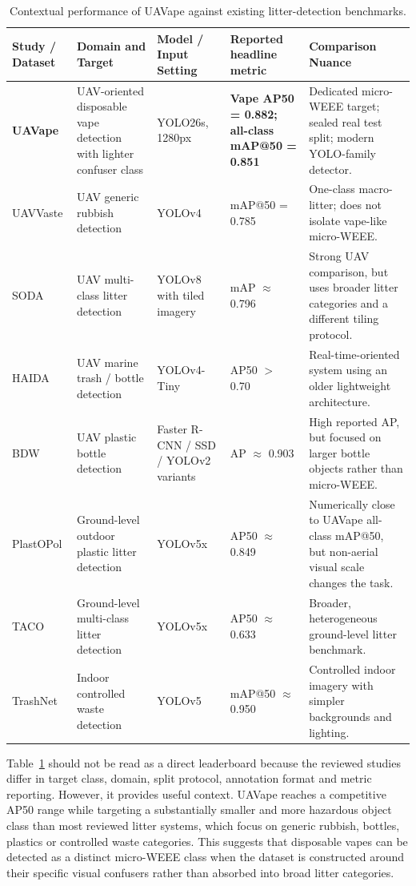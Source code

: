 \begin{table}[H]
\centering
\scriptsize
\renewcommand{\arraystretch}{1.2}
\begin{tabularx}{\textwidth}{@{} p{} p{} p{} p{} X @{}}
\toprule
\textbf{Study / Dataset} & \textbf{Domain and Target} & \textbf{Model / Input Setting} & \textbf{Reported headline metric} & \textbf{Comparison Nuance} \\
\midrule
\textbf{UAVape} & UAV-oriented disposable vape detection with lighter confuser class & YOLO26s, 1280px & \textbf{Vape AP50 = 0.882; all-class mAP@50 = 0.851} & Dedicated micro-WEEE target; sealed real test split; modern YOLO-family detector. \\
UAVVaste & UAV generic rubbish detection & YOLOv4 & mAP@50 = 0.785 & One-class macro-litter; does not isolate vape-like micro-WEEE. \\
SODA & UAV multi-class litter detection & YOLOv8 with tiled imagery & mAP $\approx$ 0.796 & Strong UAV comparison, but uses broader litter categories and a different tiling protocol. \\
HAIDA & UAV marine trash / bottle detection & YOLOv4-Tiny & AP50 $>$ 0.70 & Real-time-oriented system using an older lightweight architecture. \\
BDW & UAV plastic bottle detection & Faster R-CNN / SSD / YOLOv2 variants & AP $\approx$ 0.903 & High reported AP, but focused on larger bottle objects rather than micro-WEEE. \\
PlastOPol & Ground-level outdoor plastic litter detection & YOLOv5x & AP50 $\approx$ 0.849 & Numerically close to UAVape all-class mAP@50, but non-aerial visual scale changes the task. \\
TACO & Ground-level multi-class litter detection & YOLOv5x & AP50 $\approx$ 0.633 & Broader, heterogeneous ground-level litter benchmark. \\
TrashNet & Indoor controlled waste detection & YOLOv5 & mAP@50 $\approx$ 0.950 & Controlled indoor imagery with simpler backgrounds and lighting. \\
\bottomrule
\end{tabularx}
\caption{Contextual performance of UAVape against existing litter-detection benchmarks.}
\label{tab:discussion_literature_comparison}
\end{table}

Table~\ref{tab:discussion_literature_comparison} should not be read as a direct leaderboard because the reviewed studies differ in target class, domain, split protocol, annotation format and metric reporting. However, it provides useful context. UAVape reaches a competitive AP50 range while targeting a substantially smaller and more hazardous object class than most reviewed litter systems, which focus on generic rubbish, bottles, plastics or controlled waste categories. This suggests that disposable vapes can be detected as a distinct micro-WEEE class when the dataset is constructed around their specific visual confusers rather than absorbed into broad litter categories.

